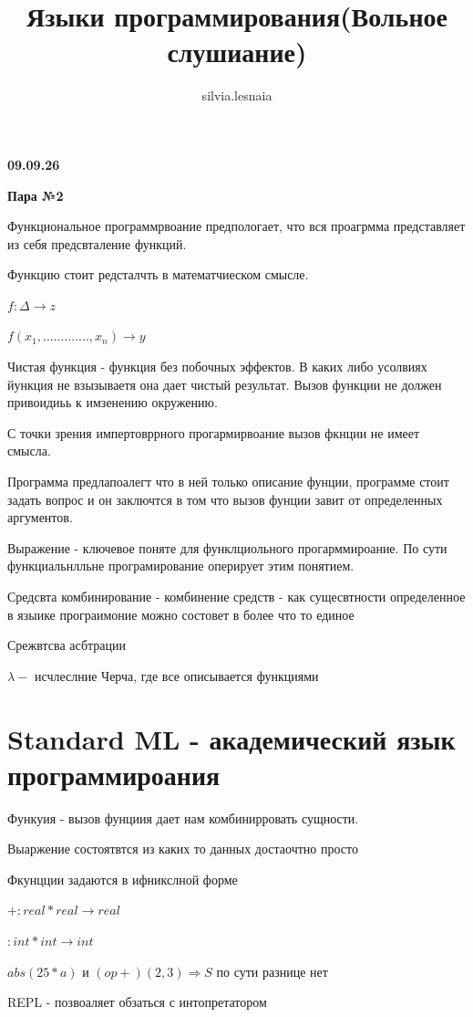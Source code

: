 \documentclass{article}
\title{Языки программирования(Вольное слушиание)}
\author{silvia.lesnaia }
\begin{document}
\maketitle

\textbf{09.09.26}

\textbf{Пара №2}

Функциональное программрвоание предпологает, что вся проагрмма представляет из себя предсвталение функций. 

Функцию стоит редсталчть в математчиеском смысле. 

$f:\Delta \rightarrow z$

$f(x_1,.............,x_n) \rightarrow y$

Чистая функция - функция без побочных эффектов. В каких либо усолвиях йункция не взызываетя 
она дает чистый результат. Вызов функции не должен привоидиьь к имзенению окружению.

С точки зрения импертовррного прогармирвоание вызов фкнции не имеет смысла. 

Программа предлапоалегт что в ней только описание фунции, программе стоит задать вопрос и он заключтся в том что 
вызов фунции завит от определенных аргументов. 


Выражение - ключевое поняте для функлциольного прогарммироание. По сути 
функциальнлльне програмирование оперирует этим понятием.

Средсвта комбинирование - комбинение средств  - как сущесвтности определенное 
в языике програимоние можно состовет в более что то единое 

Срежвтсва асбтрации


$\lambda -$ исчлеслние Черча, где все описывается функциями


\section{Standard ML - академический язык программироания}

Функуия - вызов фунциия дает нам комбинирровать сущности. 

Выаржение состоятвтся из каких то данных достаочтно просто

Фкунцции задаются в ифникслной форме

$+ : real*real \rightarrow real$

$: int*int \rightarrow int$

$abs(25*a)$ и $(op+)(2,3) \Rightarrow S$ по сути разнице нет

REPL - позвоаляет обзаться с интопретатором
\end{document}
